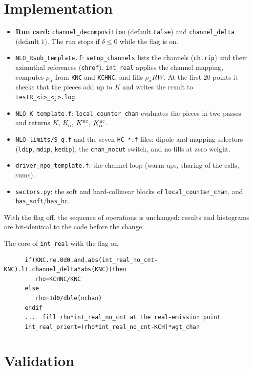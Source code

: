 \documentclass[11pt,a4paper]{article}
\newcommand{\nc}{{\rm nc}}
\begin{document}
\section{Implementation}

\begin{itemize}
\item \textbf{Run card:} \texttt{channel\_decomposition} (default
      \texttt{False}) and \texttt{channel\_delta} (default $1$). The run stops
      if $\delta\le0$ while the flag is on.
\item \texttt{NLO\_Rsub\_template.f}:
      \texttt{setup\_channels} lists the channels (\texttt{chtrip}) and their
      azimuthal references (\texttt{chref}). \texttt{int\_real} applies the
      channel mapping, computes $\rho_\alpha$ from \texttt{KNC} and
      \texttt{KCHNC}, and fills $\rho_\alpha R W$. At the first 20 points it
      checks that the pieces add up to $K$ and writes the result to
      \texttt{testR\_<i>\_<j>.log}.
\item \texttt{NLO\_K\_template.f}: \texttt{local\_counter\_chan} evaluates the
      pieces in two passes and returns $K$, $K_\alpha$, $K^\nc$, $K^\nc_\alpha$.
\item \texttt{NLO\_limits/S\_g.f} and the seven \texttt{HC\_*.f} files:
      dipole and mapping selectors (\texttt{ldip}, \texttt{mdip},
      \texttt{kedip}), the \texttt{chan\_nocut} switch, and no fills at zero
      weight.
\item \texttt{driver\_npo\_template.f}: the channel loop (warm-ups, sharing of
      the calls, sums).
\item \texttt{sectors.py}: the soft and hard-collinear blocks of
      \texttt{local\_counter\_chan}, and \texttt{has\_soft}/\texttt{has\_hc}.
\end{itemize}
With the flag off, the sequence of operations is unchanged: results and
histograms are bit-identical to the code before the change.

The core of \texttt{int\_real} with the flag on:
\begin{lstlisting}
      if(KNC.ne.0d0.and.abs(int_real_no_cnt-KNC).lt.channel_delta*abs(KNC))then
         rho=KCHNC/KNC
      else
         rho=1d0/dble(nchan)
      endif
      ...  fill rho*int_real_no_cnt at the real-emission point
      int_real_orient=(rho*int_real_no_cnt-KCH)*wgt_chan
\end{lstlisting}

\section{Validation}
\end{document}
